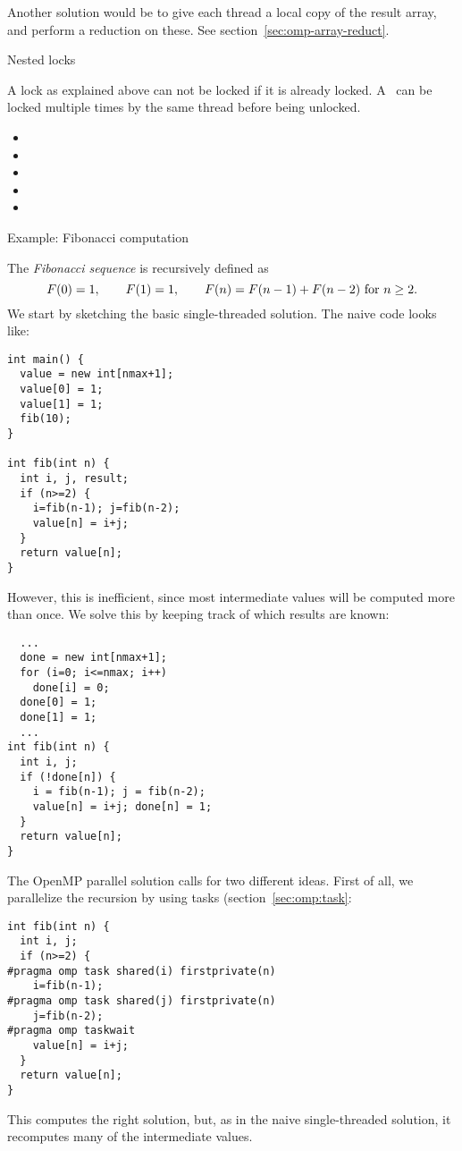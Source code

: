 Another solution would be to give each thread a local copy
of the result array, and perform a reduction on these.
See section~\ref{sec:omp-array-reduct}.

 {Nested locks}

A lock as explained above can not be locked if it is already locked.
A~ can be locked multiple times by the same
thread before being unlocked.

\begin{itemize}
\item {}
\item {}
\item {}
\item {}
\item {}
\end{itemize}


 {Example: Fibonacci computation}

The \emph{Fibonacci sequence} is recursively defined as
\[ F(0)=1,\qquad F(1)=1,\qquad F(n)=F(n-1)+F(n-2)
\hbox{ for $n\geq2$}.
\]
We start by sketching the basic single-threaded solution.
The naive code looks like:
\begin{lstlisting}
int main() {
  value = new int[nmax+1];
  value[0] = 1;
  value[1] = 1;
  fib(10);
}

int fib(int n) {
  int i, j, result;
  if (n>=2) {
    i=fib(n-1); j=fib(n-2);
    value[n] = i+j;
  }
  return value[n];
}
\end{lstlisting}
However, this is inefficient, since most intermediate values will be computed
more than once. We solve this by keeping track of which results are known:
\begin{lstlisting}
  ...
  done = new int[nmax+1];
  for (i=0; i<=nmax; i++)
    done[i] = 0;
  done[0] = 1;
  done[1] = 1;
  ...
int fib(int n) {
  int i, j;
  if (!done[n]) {
    i = fib(n-1); j = fib(n-2);
    value[n] = i+j; done[n] = 1;
  }
  return value[n];
}
\end{lstlisting}
The OpenMP parallel solution calls for two different ideas. First of all,
we parallelize the recursion by using tasks (section~\ref{sec:omp:task}:
\begin{lstlisting}
int fib(int n) {
  int i, j;
  if (n>=2) {
#pragma omp task shared(i) firstprivate(n)
    i=fib(n-1);
#pragma omp task shared(j) firstprivate(n)
    j=fib(n-2);
#pragma omp taskwait
    value[n] = i+j;
  }
  return value[n];
}
\end{lstlisting}
This computes the right solution, but, as in the naive single-threaded solution,
it recomputes many of the intermediate values.

